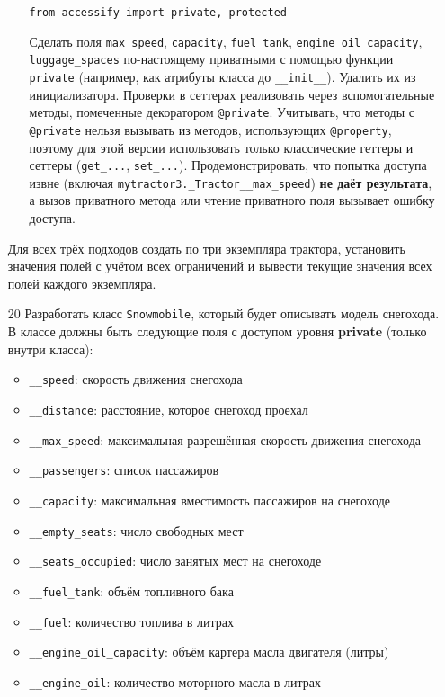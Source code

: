 \begin{enumerate}
\begin{enumerate}
    \begin{verbatim}
from accessify import private, protected
    \end{verbatim}  
    Сделать поля \texttt{max\_speed}, \texttt{capacity}, \texttt{fuel\_tank}, \texttt{engine\_oil\_capacity}, \texttt{luggage\_spaces} по-настоящему приватными с помощью функции \texttt{private} (например, как атрибуты класса до \texttt{\_\_init\_\_}). Удалить их из инициализатора.  
    Проверки в сеттерах реализовать через вспомогательные методы, помеченные декоратором \texttt{@private}.  
    Учитывать, что методы с \texttt{@private} нельзя вызывать из методов, использующих \texttt{@property}, поэтому для этой версии использовать только классические геттеры и сеттеры (\texttt{get\_...}, \texttt{set\_...}).  
    Продемонстрировать, что попытка доступа извне (включая \texttt{mytractor3.\_Tractor\_\_max\_speed}) \textbf{не даёт результата}, а вызов приватного метода или чтение приватного поля вызывает ошибку доступа.
\end{enumerate}
Для всех трёх подходов создать по три экземпляра трактора, установить значения полей с учётом всех ограничений и вывести текущие значения всех полей каждого экземпляра.
\item[20] Разработать класс \texttt{Snowmobile}, который будет описывать модель снегохода. В классе должны быть следующие поля с доступом уровня \textbf{private} (только внутри класса):
\begin{itemize}
    \item \texttt{\_\_speed}: скорость движения снегохода  
    \item \texttt{\_\_distance}: расстояние, которое снегоход проехал  
    \item \texttt{\_\_max\_speed}: максимальная разрешённая скорость движения снегохода  
    \item \texttt{\_\_passengers}: список пассажиров  
    \item \texttt{\_\_capacity}: максимальная вместимость пассажиров на снегоходе  
    \item \texttt{\_\_empty\_seats}: число свободных мест  
    \item \texttt{\_\_seats\_occupied}: число занятых мест на снегоходе  
    \item \texttt{\_\_fuel\_tank}: объём топливного бака  
    \item \texttt{\_\_fuel}: количество топлива в литрах  
    \item \texttt{\_\_engine\_oil\_capacity}: объём картера масла двигателя (литры)  
    \item \texttt{\_\_engine\_oil}: количество моторного масла в литрах  

\end{itemize}
\end{enumerate}
